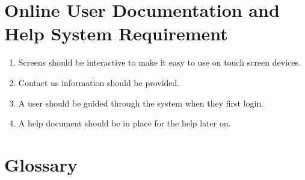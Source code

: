 \documentclass{article}
\begin{document}
\section{ Online User Documentation and Help System Requirement}
\begin{enumerate}
    \item Screens should be interactive to make it easy to use on touch screen devices.
    \item Contact us information should be provided.
    \item A user should be guided through the system when they first login.
    \item A help document should be in place for the help later on.
\end{enumerate}

\section{ Glossary}
\label{sec:Glossary}
\end{document}
